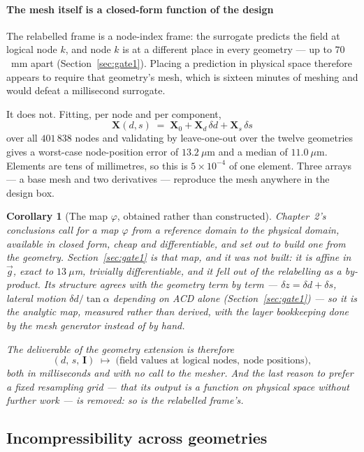 \documentclass[11pt,a4paper]{article}
\newcommand{\vect}[1]{\mathbf{#1}}
\theoremstyle{plain}
\newtheorem{corollary}[proposition]{Corollary}
\theoremstyle{definition}
\theoremstyle{remark}
\begin{document}
\label{meas:position-map}
\paragraph{The mesh itself is a closed-form function of the design}
The relabelled frame is a node-index frame: the surrogate predicts the field at
logical node $k$, and node $k$ is at a different place in every geometry --- up
to $70$~mm apart (Section~\ref{sec:gate1}). Placing a prediction in
physical space therefore appears to require that geometry's mesh, which is
sixteen minutes of meshing and would defeat a millisecond surrogate.

It does not. Fitting, per node and per component,
\[
  \vect{X}(d,s) \;=\; \vect{X}_0 + \vect{X}_d\,\delta d + \vect{X}_s\,\delta s
\]
over all $401\,838$ nodes and validating by leave-one-out over the twelve
geometries gives a worst-case node-position error of $13.2\ \mu$m and a median
of $11.0\ \mu$m. Elements are tens of millimetres, so this is $5\times10^{-4}$
of one element. Three arrays --- a base mesh and two derivatives --- reproduce
the mesh anywhere in the design box.

\begin{corollary}[The map $\varphi$, obtained rather than constructed]
\label{cor:phi-measured}
Chapter~2's conclusions call for a map $\varphi$ from a reference domain to the
physical domain, available in closed form, cheap and differentiable, and set out
to build one from the geometry. Section~\ref{sec:gate1} \emph{is}
that map, and it was not built: it is affine in $\vec g$, exact to $13\ \mu$m,
trivially differentiable, and it fell out of the relabelling as a by-product.
Its structure agrees with the geometry term by term ---
$\delta z = \delta d + \delta s$, lateral motion
$\delta d/\tan\alpha$ depending on ACD alone
(Section~\ref{sec:gate1}) --- so it is the analytic map, measured
rather than derived, with the layer bookkeeping done by the mesh generator
instead of by hand.

The deliverable of the geometry extension is therefore
\[
  (d,\,s,\,\vect{I}) \;\longmapsto\; \bigl(\text{field values at logical nodes},\
  \text{node positions}\bigr),
\]
both in milliseconds and with no call to the mesher. And the last reason to
prefer a fixed resampling grid --- that its output is a function on physical
space without further work --- is removed: so is the relabelled frame's.
\end{corollary}

\subsection{Incompressibility across geometries}
\label{sec:divergence}
\end{document}
